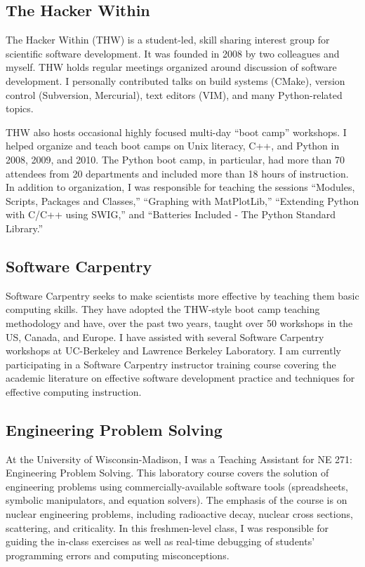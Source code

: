 \documentclass[letterpaper,11pt]{article}
\begin{document}
\subsection*{The Hacker Within}
The Hacker Within (THW) is a student-led, skill sharing interest group for
scientific software development.  It was founded in 2008 by two colleagues and
myself.  THW holds regular meetings organized around discussion of software
development.  I personally contributed talks on build systems (CMake), version
control (Subversion, Mercurial), text editors (VIM), and many Python-related
topics.

\vspace{0.1in}

THW also hosts occasional highly focused multi-day ``boot camp'' workshops. I
helped organize and teach boot camps on Unix literacy, C++, and Python in 2008,
2009, and 2010.  The Python boot camp, in particular, had more than 70 attendees
from 20 departments and included more than 18 hours of instruction.  In
addition to organization, I was responsible for teaching the sessions
``Modules, Scripts, Packages and Classes,''  ``Graphing with MatPlotLib,''
``Extending Python with C/C++ using SWIG,''  and ``Batteries Included - The
Python Standard Library.''

\subsection*{Software Carpentry}
Software Carpentry seeks to make scientists more effective by teaching them
basic computing skills.  They have adopted the THW-style boot camp teaching
methodology and have, over the past two years, taught over 50 workshops in the
US, Canada, and Europe.  I have assisted with several Software Carpentry
workshops at UC-Berkeley and Lawrence Berkeley Laboratory.  I am currently
participating in a Software Carpentry instructor training course covering the
academic literature on effective software development practice and techniques
for effective computing instruction.

\subsection*{Engineering Problem Solving}
At the University of Wisconsin-Madison, I was a Teaching Assistant for NE 271:
Engineering Problem Solving.  This laboratory course covers the solution of engineering
problems using commercially-available software tools (spreadsheets, symbolic
manipulators, and equation solvers). The emphasis of the course is on nuclear
engineering problems, including radioactive decay, nuclear cross sections,
scattering, and criticality.  In this freshmen-level class, I was responsible
for guiding the in-class exercises as well as real-time debugging of students'
programming errors and computing misconceptions.
\end{document}
